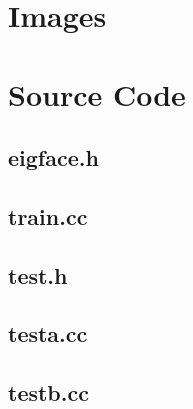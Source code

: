 \clearpage

\section{Images}



\clearpage

\section{Source Code}
  \subsection{eigface.h}
    
  \subsection{train.cc}
    
  \subsection{test.h}
    
  \subsection{testa.cc}
    
  \subsection{testb.cc}
    

